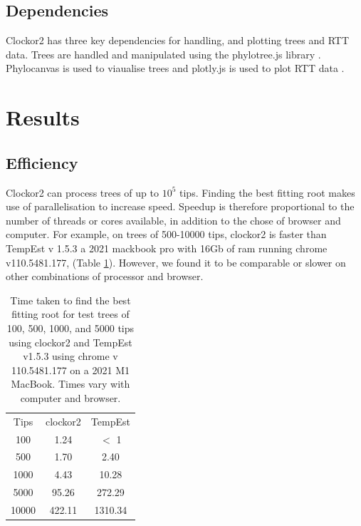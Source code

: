 \documentclass{article}
\begin{document}
\subsection*{Dependencies}
Clockor2 has three key dependencies for handling, and plotting trees and RTT data. Trees are handled and manipulated using the phylotree.js library \citep{shank_phylotreejs_2018}. Phylocanvas is used to viaualise trees and plotly.js is used to plot RTT data \citep{abudahab_phylocanvasgl_2021}.

\section*{Results}
\subsection*{Efficiency}
Clockor2 can process trees of up to $10^5$ tips. Finding the best fitting root makes use of parallelisation to increase speed. Speedup is therefore proportional to the number of threads or cores available, in addition to the chose of browser and computer. For example, on trees of 500-10000 tips, clockor2 is faster than TempEst v 1.5.3 a 2021 mackbook pro with 16Gb of ram running chrome v110.5481.177, (Table \ref{tab:bfr}). However, we found it to be comparable or slower on other combinations of processor and browser.

\begin{table}[H]
    \centering
    \begin{tabular}{c|c|c}
        Tips    & clockor2  & TempEst   \\
        100     & 1.24     & $<$ 1     \\
        500     & 1.70      & 2.40      \\
        1000    & 4.43      & 10.28      \\
        5000    &  95.26   & 272.29   \\
        10000   &  422.11  & 1310.34    \\
    \end{tabular}
    \caption{Time taken to find the best fitting root for test trees of 100, 500, 1000, and 5000 tips using clockor2 and TempEst v1.5.3 using chrome v 110.5481.177 on a 2021 M1 MacBook. Times vary with computer and browser.}
    \label{tab:bfr}
\end{table}
\end{document}
